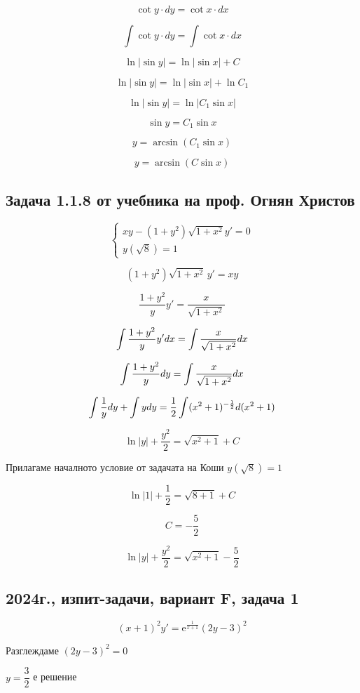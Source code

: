 \documentclass{scrartcl}
\begin{document}
$$\cot{y} \cdot dy = \cot{x} \cdot dx$$

$$\int \cot{y} \cdot dy = \int \cot{x} \cdot dx$$

$$\ln{|\sin{y}|} = \ln{|\sin{x}|} + C$$

$$\ln{|\sin{y}|} = \ln{|\sin{x}|} + \ln{C_1}$$

$$\ln{|\sin{y}|} = \ln{|C_1 \sin{x}|}$$

$$\sin{y} = C_1 \sin{x}$$

$$y = \arcsin{(C_1 \sin{x})}$$

$$y = \arcsin{(C \sin{x})}$$

\subsection{Задача 1.1.8 от учебника на проф. Огнян Христов}

$$
\begin{cases}
xy-(1+y^2)\sqrt{1+x^2}y'=0\\
y(\sqrt{8})=1
\end{cases}
$$

$$(1 + y^2)\sqrt{1 + x^2} \, y' = xy$$

$$\dfrac{1+y^2}{y}y' = \dfrac{x}{\sqrt{1+x^2}}$$

$$\displaystyle \int \dfrac{1+y^2}{y}y'\space dx = \int \dfrac{x}{\sqrt{1+x^2}}\space dx$$

$$\displaystyle \int \dfrac{1+y^2}{y}\space dy = \int \dfrac{x}{\sqrt{1+x^2}}\space dx$$

$$\displaystyle \int \dfrac{1}{y}\space dy + \int y\space dy = \dfrac{1}{2} \int (x^2+1)^{-\frac{1}{2}}\space d(x^2+1)$$

$$\ln{|y|}+\dfrac{y^2}{2}=\sqrt{x^2+1}+C$$

Прилагаме началното условие от задачата на Коши $y(\sqrt{8})=1$

$$\ln{|1|} + \dfrac{1}{2} = \sqrt{8+1}+C$$

$$C=-\dfrac{5}{2}$$

$$\ln{|y|}+\dfrac{y^2}{2}=\sqrt{x^2+1}-\dfrac{5}{2}$$

\subsection{2024г., изпит-задачи, вариант F, задача 1}

$$(x+1)^2y' = \mathrm{e}^{\frac{1}{x+1}}(2y - 3)^2$$

Разглеждаме $(2y-3)^2 = 0$

$y = \dfrac{3}{2}$ е решение
\end{document}
